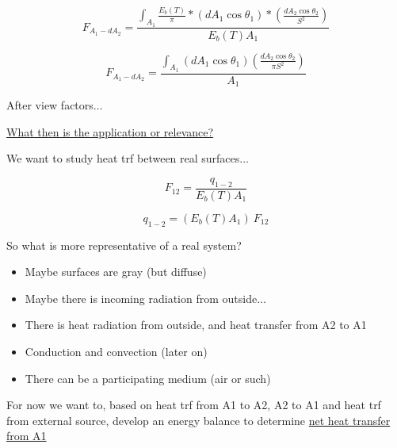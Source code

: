 \documentclass[12pt]{article}
\renewcommand{\_}{\kern-1.5pt\textunderscore\kern-1.5pt}
\begin{document}
 \[ F_{A_{1}-dA_{2}}=\frac{ \int _{A_{1}}^{}\frac{E_{b} \left( T \right) }{ \pi }\ast \left( dA_{1}\cos  \theta _{1} \right) \ast \left( \frac{dA_{2}\cos  \theta _{2}}{S^{2}} \right) }{E_{b} \left( T \right) A_{1}} \] \par

 \[ F_{A_{1}-dA_{2}}=\frac{ \int _{A_{1}}^{} \left( dA_{1}\cos  \theta _{1} \right)  \left( \frac{dA_{2}\cos  \theta _{2}}{ \pi S^{2}} \right) }{A_{1}} \] \par

After view factors$ \ldots $ \par

\uline{What then is the application or relevance?}\par

We want to study heat trf between real surfaces$ \ldots $ \par

\par

 \[ F_{12}=\frac{q_{1-2}}{E_{b} \left( T \right) A_{1}} \] \par

 \[ q_{1-2}= \left( E_{b} \left( T \right) A_{1} \right) ~F_{12} \] \par

So what is more representative of a real system?\par

\begin{itemize}
	\item Maybe surfaces are gray (but diffuse)\par

	\item Maybe there is incoming radiation from outside$ \ldots $ \par

	\item There is heat radiation from outside, and heat transfer from A2 to A1\par

	\item Conduction and convection (later on)\par

	\item There can be a participating medium (air or such)\par
\end{itemize}



\vspace{\baselineskip}
For now we want to, based on heat trf from A1 to A2, A2 to A1 and heat trf from external source, develop an energy balance to determine \uline{net heat transfer from A1}\par
\end{document}
